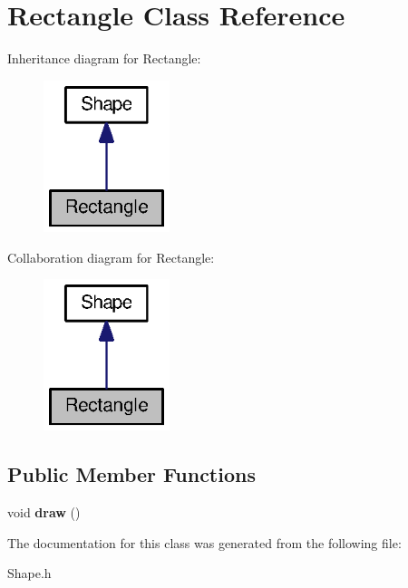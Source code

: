 \section{Rectangle Class Reference}
\label{class_rectangle}


Inheritance diagram for Rectangle\-:
\nopagebreak
\begin{figure}[H]
\begin{center}
\leavevmode
\includegraphics[width=104pt]{class_rectangle__inherit__graph}
\end{center}
\end{figure}


Collaboration diagram for Rectangle\-:
\nopagebreak
\begin{figure}[H]
\begin{center}
\leavevmode
\includegraphics[width=104pt]{class_rectangle__coll__graph}
\end{center}
\end{figure}
\subsection*{Public Member Functions}
\begin{DoxyCompactItemize}
\item 
void {\bfseries draw} ()\label{class_rectangle_ac895c67f1d6337e3b4f72663b17dd299}

\end{DoxyCompactItemize}


The documentation for this class was generated from the following file\-:\begin{DoxyCompactItemize}
\item 
Shape.\-h\end{DoxyCompactItemize}
